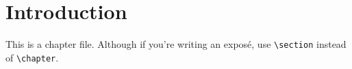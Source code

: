 \chapter{Introduction}\label{ch:introduction}

This is a chapter file. Although if you're writing an exposé, use \texttt{\textbackslash section} instead of \texttt{\textbackslash chapter}.
